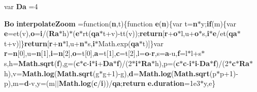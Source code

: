 \begin{DoxyCompactItemize}
var {\bf Da} =4
\item 
{\bf Bo} {\bf interpolate\+Zoom} =function({\bf n},t)\{function {\bf e}({\bf n})\{var t={\bf n}$\ast$y;{\bf if}(m)\{var {\bf e}=et(v),{\bf o}={\bf i}/({\bf Ra}$\ast$h)$\ast$({\bf e}$\ast$rt({\bf qa}$\ast$t+v)-\/tt(v));{\bf return}[{\bf r}+{\bf o}$\ast$l,u+{\bf o}$\ast$s,{\bf i}$\ast${\bf e}/et({\bf qa}$\ast$t+v)]\}{\bf return}[{\bf r}+{\bf n}$\ast$l,u+{\bf n}$\ast$s,{\bf i}$\ast$Math.\+exp({\bf qa}$\ast$t)]\}var {\bf r}={\bf n}[0],u={\bf n}[1],{\bf i}={\bf n}[2],{\bf o}=t[0],{\bf a}=t[1],{\bf c}=t[2],l={\bf o}-\/{\bf r},s={\bf a}-\/u,{\bf f}=l$\ast$l+s$\ast$s,h={\bf Math.\+sqrt}({\bf f}),g=({\bf c}$\ast${\bf c}-\/{\bf i}$\ast${\bf i}+{\bf Da}$\ast${\bf f})/(2$\ast${\bf i}$\ast${\bf Ra}$\ast$h),p=({\bf c}$\ast${\bf c}-\/{\bf i}$\ast${\bf i}-\/{\bf Da}$\ast${\bf f})/(2$\ast${\bf c}$\ast${\bf Ra}$\ast$h),v={\bf Math.\+log}({\bf Math.\+sqrt}(g$\ast$g+1)-\/g),{\bf d}={\bf Math.\+log}({\bf Math.\+sqrt}(p$\ast$p+1)-\/p),m={\bf d}-\/v,y=(m$\vert$$\vert${\bf Math.\+log}({\bf c}/{\bf i}))/{\bf qa};{\bf return} {\bf e.\+duration}=1e3$\ast$y,e\}
\item 
$$
\end{DoxyCompactItemize}
